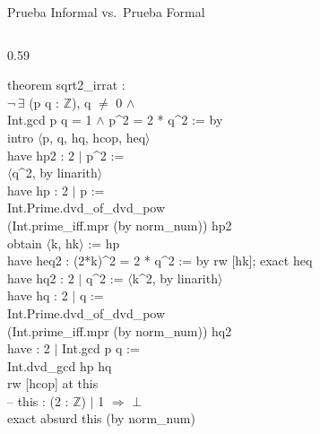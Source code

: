 \documentclass[aspectratio=169, 10pt]{beamer}
\begin{document}
\begin{frame}{Prueba Informal vs.\ Prueba Formal}
\begin{columns}[T]
\begin{column}{0.59\textwidth}
      \colorbox{darkframe}{\parbox{\linewidth}{%
        \ttfamily\scriptsize\color{leanpurple}
        theorem sqrt2\_irrat :\\[1pt]
        \hspace*{0.4em}$\neg\,\exists$ (p q : $\mathbb{Z}$), q $\neq$ 0 $\wedge$\\[1pt]
        \hspace*{1.0em}Int.gcd p q = 1 $\wedge$ p\^{}2 = 2 * q\^{}2 := by\\[1pt]
        \hspace*{0.4em}intro $\langle$p, q, hq, hcop, heq$\rangle$\\[1pt]
        \hspace*{0.4em}have hp2 : 2 $\mid$ p\^{}2 :=\\[1pt]
        \hspace*{1.8em}$\langle$q\^{}2, by linarith$\rangle$\\[1pt]
        \hspace*{0.4em}have hp : 2 $\mid$ p :=\\[1pt]
        \hspace*{1.8em}Int.Prime.dvd\_of\_dvd\_pow\\[1pt]
        \hspace*{2.4em}(Int.prime\_iff.mpr (by norm\_num)) hp2\\[1pt]
        \hspace*{0.4em}obtain $\langle$k, hk$\rangle$ := hp\\[1pt]
        \hspace*{0.4em}have heq2 : (2*k)\^{}2 = 2 * q\^{}2 := by rw [\textleftarrow hk]; exact heq\\[1pt]
        \hspace*{0.4em}have hq2 : 2 $\mid$ q\^{}2 := $\langle$k\^{}2, by linarith$\rangle$\\[1pt]
        \hspace*{0.4em}have hq : 2 $\mid$ q :=\\[1pt]
        \hspace*{1.8em}Int.Prime.dvd\_of\_dvd\_pow\\[1pt]
        \hspace*{2.4em}(Int.prime\_iff.mpr (by norm\_num)) hq2\\[1pt]
        \hspace*{0.4em}have : 2 $\mid$ Int.gcd p q :=\\[1pt]
        \hspace*{1.8em}Int.dvd\_gcd hp hq\\[1pt]
        \hspace*{0.4em}rw [hcop] at this\\[1pt]
        \hspace*{0.4em}\textcolor{cpGray}{-- this : (2 : $\mathbb{Z}$) $\mid$ 1 $\Rightarrow$ $\bot$}\\[1pt]
        \hspace*{0.4em}exact absurd this (by norm\_num)
      }}
    \end{column}
  \end{columns}
\end{frame}
\end{document}
